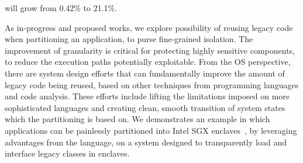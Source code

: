 will grow from 0.42\% to 21.1\%.



As in-progress and proposed works,
we explore possibility of reusing legacy code when partitioning an application,
to purse fine-grained isolation.
The improvement of granularity is critical for protecting highly sensitive components,
to reduce the execution paths
potentially exploitable.
From the OS perspective,
there are system design efforts that
can fundamentally improve the amount of legacy code being reused,
based on other techniques from programming languages and code analysis.
These efforts include
lifting the limitations imposed on more sophisticated languages
and creating clean, smooth transition of system states
which the partitioning is based on.
We demonstrates an example
in which applications can be painlessly partitioned
into Intel SGX enclaves~\citep{intelsgx},
by leveraging advantages from the \java{} language,
on a system designed to transparently load and interface legacy \java{} classes in enclaves.


